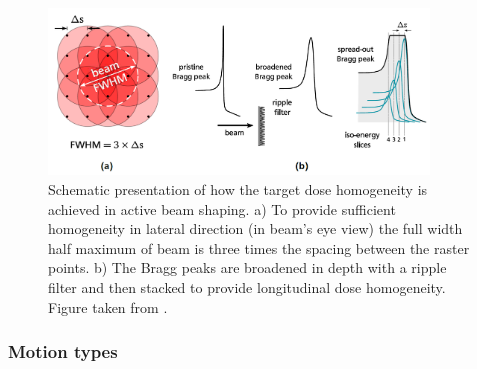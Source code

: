 \begin{figure}[H]
\begin{center}
\includegraphics[width=0.9\textwidth]{./Fundamentals/Images/active.png}
\caption{Schematic presentation of how the target dose homogeneity is achieved in active beam shaping. a) To provide sufficient homogeneity in lateral direction (in beam's eye view) the full width
half maximum of beam is three times the spacing between the raster points. b) The Bragg peaks are broadened in depth with a ripple filter and then stacked to provide longitudinal dose homogeneity. 
Figure taken from \cite{Richter2012}.}
\label{active}
\end{center}
\end{figure}


\newpage




\subsubsection{Motion types}

